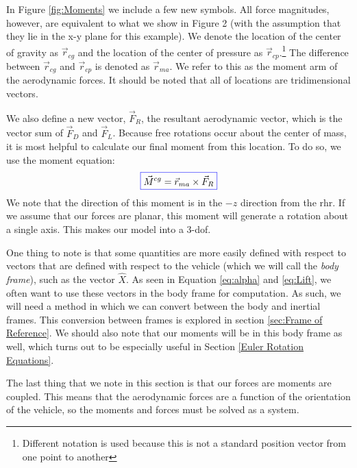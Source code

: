 \documentclass[12pt]{report}
\begin{document}
In Figure \ref{fig:Moments} we include a few new symbols. All force magnitudes, however, are equivalent to what we show in Figure 2 (with the assumption that they lie in the x-y plane for this example). We denote the location of the center of gravity as $\vec{r}_{cg}$ and the location of the center of pressure as $\vec{r}_{cp}$.\footnote{Different notation is used because this is not a standard position vector from one point to another} The difference between $\vec{r}_{cg}$ and $\vec{r}_{cp}$ is denoted as $\vec{r}_{ma}$. We refer to this as the moment arm of the aerodynamic forces. It should be noted that all of locations are tridimensional vectors. 

We also define a new vector, $\vec{F}_R$, the resultant aerodynamic vector, which is the vector sum of $\vec{F}_D$ and $\vec{F}_L$. Because free rotations occur about the center of mass, it is most helpful to calculate our final moment from this location. To do so, we use the moment equation:
\begin{gather}
    \color{blue}\boxed{\color{black}\vec{M}^{cg}=\vec{r}_{ma}\times \vec{F}_R}
\end{gather}
We note that the direction of this moment is in the $-\hat{z}$ direction from the \gls{rhr}. If we assume that our forces are planar, this moment will generate a rotation about a single axis. This makes our model into a 3-\gls{dof}.

One thing to note is that some quantities are more easily defined with respect to vectors that are defined with respect to the vehicle (which we will call the \textit{body frame}), such as the vector $\hat{X}$. As seen in Equation \eqref{eq:alpha} and \eqref{eq:Lift}, we often want to use these vectors in the body frame for computation. As such, we will need a method in which we can convert between the body and inertial frames. This conversion between frames is explored in section \ref{sec:Frame of Reference}. We should also note that our moments will be in this body frame as well, which turns out to be especially useful in Section \ref{Euler Rotation Equations}.

The last thing that we note in this section is that our forces are moments are coupled. This means that the aerodynamic forces are a function of the orientation of the vehicle, so the moments and forces must be solved as a system.
\end{document}
